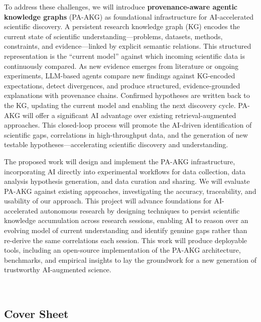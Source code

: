 \documentclass{files/proposalnsf}
\begin{document}
To address these challenges, we will introduce \textbf{provenance-aware agentic knowledge graphs} (PA-AKG) as foundational infrastructure for AI-accelerated scientific discovery. A persistent research knowledge graph (KG) encodes the current state of scientific understanding---problems, datasets, methods, constraints, and evidence---linked by explicit semantic relations. This structured representation is the ``current model'' against which incoming scientific data is continuously compared. As new evidence emerges from literature or ongoing experiments, LLM-based agents compare new findings against KG-encoded expectations, detect divergences, and produce structured, evidence-grounded explanations with provenance chains. Confirmed hypotheses are written back to the KG, updating the current model and enabling the next discovery cycle. PA-AKG will offer a significant AI advantage over existing retrieval-augmented approaches. This closed-loop process will promote the AI-driven identification of scientific gaps, correlations in high-throughput data, and the generation of new testable hypotheses---accelerating scientific discovery and understanding.


The proposed work will design and implement the PA-AKG infrastructure, incorporating AI directly into experimental workflows for data collection, data analysis hypothesis generation, and data curation and sharing. We will evaluate PA-AKG against existing approaches, investigating the accuracy, traceability, and usability of our approach. This project will advance foundations for AI-accelerated autonomous research by designing techniques to persist scientific knowledge accumulation across research sessions, enabling AI to reason over an evolving model of current understanding and identify genuine gaps rather than re-derive the same correlations each session. This work will produce deployable tools, including an open-source implementation of the PA-AKG architecture, benchmarks, and empirical insights to lay the groundwork for a new generation of trustworthy AI-augmented science.

\newpage
{}

\begin{center}
    \large{\proposalEleven} \\ \vspace{0.5pt}
\end{center}\vspace{-15pt}

\subsection*{Cover Sheet} \vspace{12pt}
\end{document}
